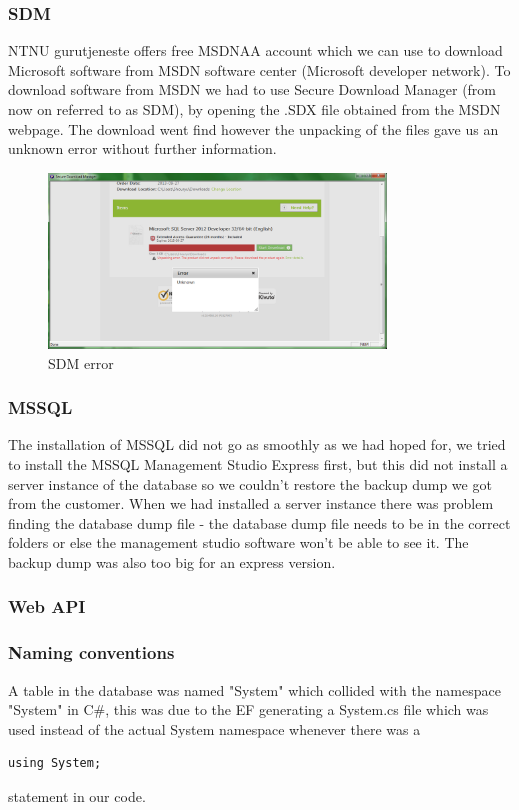 \subsubsection{SDM}
NTNU gurutjeneste offers free MSDNAA account which we can use to download Microsoft software from MSDN software center (Microsoft developer network). To download software from MSDN we had to use Secure Download Manager (from now on referred to as SDM), by opening the .SDX file obtained from the MSDN webpage. The download went find however the unpacking of the files gave us an unknown error without further information.
\begin{figure}[H]
\centering
\includegraphics[width=0.8\textwidth]{images/issue00.png}
\caption{SDM error}
\label{fig:SDM_error}
\end{figure}

\subsubsection{MSSQL}
The installation of MSSQL did not go as smoothly as we had hoped for, we tried to install the MSSQL Management Studio Express first, but this did not install a server instance of the database so we couldn't restore the backup dump we got from the customer. When we had installed a server instance there was problem finding the database dump file - the database dump file needs to be in the correct folders or else the management studio software won't be able to see it. The backup dump was also too big for an express version.

\subsubsection{Web API}
\label{subsubsec:webapiissues}

\subsubsection{Naming conventions}
A table in the database was named "System" which collided with the namespace "System" in C\#, this was due to the EF generating a System.cs file which was used instead of the actual System namespace whenever there was a 
\begin{lstlisting}
using System;
\end{lstlisting}
statement in our code.

